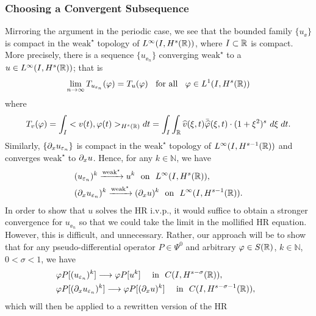 \subsubsection{Choosing a Convergent Subsequence}
Mirroring the argument in the periodic case, we see that the bounded
family $\{u_\ee\}$ is compact in the $\text{weak}^{\star}$ topology of $L^\infty(I,
H^{s}(\mathbb{R}))$, where $I \subset \mathbb{R}$ is compact. More precisely, there is a sequence  $\{ u_{\ee_n} \}$
converging $\text{weak}^{\star}$ to a $ u\in L^{\infty}(I, H^s(\mathbb{R}))$; that is 
%
\begin{equation*}
\label{hhweak-conv}
\lim_{n\to \infty} T_{u_{\varepsilon_n}}(\varphi)  =  T_u (\varphi) 
\; \;		
\ \text{for all} \  \;\;  \varphi \in L^1(I, H^{s}(\mathbb{R}))
\end{equation*}
where
\begin{equation}
T_v(\varphi) = \int_I <v (t), \varphi (t)>_{H^s(\mathbb{R})} dt  = \int_I
\int_{\mathbb{R}}
\widehat{v}(\xi, t) \bar{\widehat{\varphi}} (\xi, t) \cdot (1 +
\xi^2)^s \ d \xi \; dt.
\end{equation}
%
Similarly, $\left\{ \partial_x u_{\varepsilon_n} \right\}$ is compact in the
$\text{weak}^{\star}$ topology of $L^\infty(I, H^{s-1}(\mathbb{R}))$ and converges $\text{weak}^{\star}$
to $\partial_x u$. Hence, for any $k \in \mathbb{N}$, we have
\begin{align}
\label{base-weak}
& (u_{\varepsilon_n})^k \xrightarrow{\text{weak}^{\star}} u^k \ \
\text{on} \ \
L^\infty(I, H^s(\mathbb{R})),
\\
\label{base-weak-2}
& (\partial_x u_{\varepsilon_n})^k \xrightarrow{\text{weak}^{\star}} (\partial_x u)^k
\ \ \text{on} \ \
L^\infty(I, H^{s-1}(\mathbb{R})). 
\end{align}
In order to show that $u$ solves the HR i.v.p., it would
suffice to obtain a stronger convergence for  $u_{\ee_n}$ so that 
we could take the limit in the mollified HR equation. However,
this is difficult, and unnecessary. Rather, our approach will be to
show that for any pseudo-differential operator
$P \in \Psi^0$ and arbitrary $\varphi \in S(\mathbb{R})$, $k \in
\mathbb{N}$, $0< \sigma < 1$, we have
%
%
\begin{align}
\label{hhstrong-conv}
& \varphi P [(u_{\ee_n})^k] \longrightarrow \varphi P [u^k]  
\quad
\ \text{in} \  \,\,   C(I, H^{s-\sigma}(\rr)), \ \,
\\
\label{hhstrong-conv-next}
& \varphi P [(\p_x u_{\ee_n})^k] \longrightarrow \varphi P
[(\p_x u)^k]  
\quad
\ \text{in} \  \,\,   C(I, H^{s-\sigma -1}(\rr)), \ \ 
\end{align}
%
which will then be applied to a rewritten version of the HR
